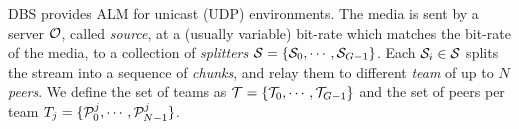DBS provides ALM for unicast (UDP) environments. The media is sent by
a server ${\cal O}$, called \emph{source}, at a (usually variable)
bit-rate which matches the bit-rate of the media, to a collection of
\emph{splitters} ${\cal S}=\{{\cal S}_0, \cdots, {\cal
  S}_{G-1}\}$. Each ${\cal S}_i \in {\cal S}$ splits the stream into a
sequence of \emph{chunks}, and relay them to different \emph{team} of
up to $N$ \emph{peers}. We define the set of teams as ${\cal
  T}=\{{\cal T}_0,\cdots,{\cal T}_{G-1}\}$ and the set of peers per
team $T_j=\{{\cal P}^j_0,\cdots,{\cal P}^j_{N-1}\}$.


